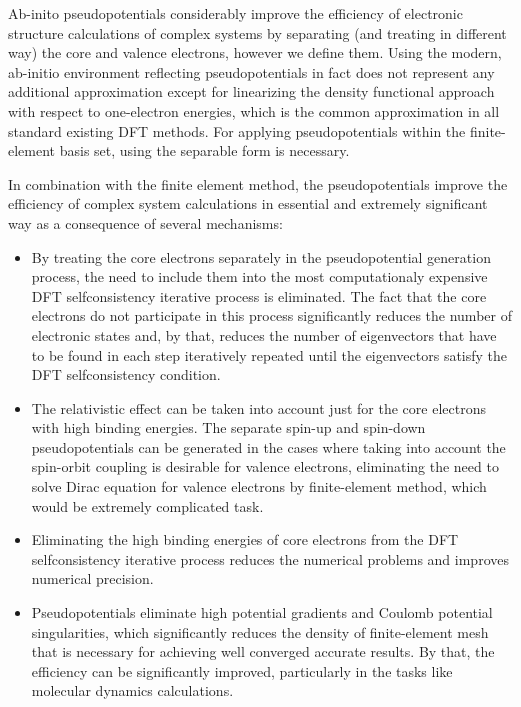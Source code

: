 Ab-inito pseudopotentials \cite{pickett} considerably improve the efficiency of
electronic structure calculations of complex systems by separating (and
treating in different way) the core and valence electrons, however we define
them.  Using the modern, ab-initio environment reflecting pseudopotentials
\cite{vackarAEPP2} in fact does not represent any additional approximation
except for linearizing the density functional approach with respect to
one-electron energies, which is the common approximation in all standard
existing DFT methods.  For applying pseudopotentials within the finite-element
basis set, using the separable form is necessary.

In combination with the finite element method, the pseudopotentials improve the
efficiency of complex system calculations in essential and extremely
significant way as a consequence of several mechanisms:
\begin{itemize}

\item By treating the core electrons separately in the pseudopotential
generation process, the need to include them into the most computationaly
expensive DFT selfconsistency iterative process is eliminated.  The fact that
the core electrons do not participate in this process significantly reduces the
number of electronic states and, by that, reduces the number of eigenvectors
that have to be found in each step iteratively repeated until the eigenvectors
satisfy the DFT selfconsistency condition.

\item The relativistic effect can be taken into account just for the core
electrons with high binding energies. The separate spin-up and spin-down
pseudopotentials can be generated in the cases where taking into account the
spin-orbit coupling is desirable for valence electrons, eliminating the need to
solve Dirac equation for valence electrons by finite-element method, which
would be extremely complicated task.

\item Eliminating the high binding energies of core electrons from the DFT
selfconsistency iterative process reduces the numerical problems and improves
numerical precision.

\item Pseudopotentials eliminate high potential gradients and Coulomb potential
singularities, which significantly reduces the density of finite-element mesh
that is necessary for achieving well converged accurate results. By that, the
efficiency can be significantly improved, particularly in the tasks like
molecular dynamics calculations.

\end{itemize}
